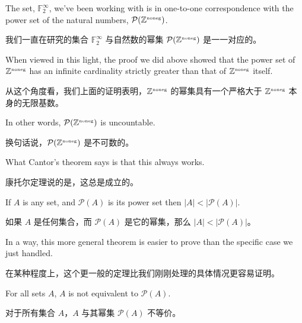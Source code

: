 The set, ${\mathbb F}_2^\infty$, we've been working with is in one-to-one correspondence
with the power set of the natural numbers, ${\mathcal P}({\mathbb Z}^{\mbox{\tiny noneg}})$.

我们一直在研究的集合 ${\mathbb F}_2^\infty$ 与自然数的幂集 ${\mathcal P}({\mathbb Z}^{\mbox{\tiny noneg}})$ 是一一对应的。

When viewed in this light, the proof we did above showed that the power
set of ${\mathbb Z}^{\mbox{\tiny noneg}}$ has an infinite cardinality strictly greater than that
of ${\mathbb Z}^{\mbox{\tiny noneg}}$ itself.

从这个角度看，我们上面的证明表明，${\mathbb Z}^{\mbox{\tiny noneg}}$ 的幂集具有一个严格大于 ${\mathbb Z}^{\mbox{\tiny noneg}}$ 本身的无限基数。

In other words, ${\mathcal P}({\mathbb Z}^{\mbox{\tiny noneg}})$ is
uncountable.

换句话说，${\mathcal P}({\mathbb Z}^{\mbox{\tiny noneg}})$ 是不可数的。

What Cantor's theorem says is that this always works.

康托尔定理说的是，这总是成立的。

If $A$ is any set,
and ${\mathcal P}(A)$ is its power set then $|A| < |{\mathcal P}(A)|$.

如果 $A$ 是任何集合，而 ${\mathcal P}(A)$ 是它的幂集，那么 $|A| < |{\mathcal P}(A)|$。

In a way, this more general
theorem is easier to prove than the specific case we just handled.

在某种程度上，这个更一般的定理比我们刚刚处理的具体情况更容易证明。

\begin{thm}[Cantor]
    For all sets $A$, $A$ is not equivalent to ${\mathcal P}(A)$.
\end{thm}

\begin{thm}[康托尔]
    对于所有集合 $A$，$A$ 与其幂集 ${\mathcal P}(A)$ 不等价。
\end{thm}

